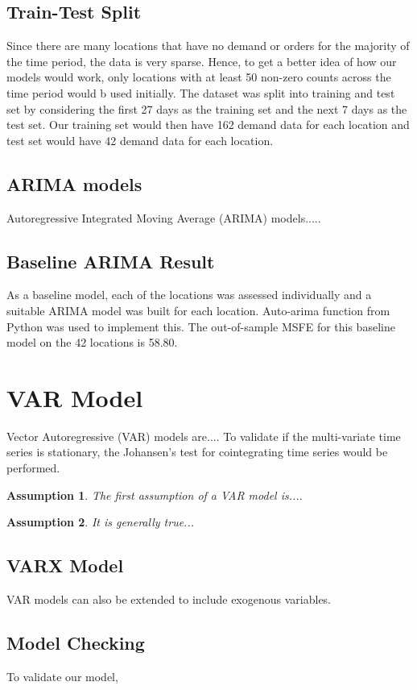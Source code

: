 \documentclass[10pt, letterpaper] {article}
\newtheorem{assumption}{Assumption}
\begin{document}
\subsection{Train-Test Split}
Since there are many locations that have no demand or orders for the majority of the time period, the data is very sparse. Hence, to get a better idea of how our models would work, only locations with at least 50 non-zero counts across the time period would b used initially. The dataset was split into training and test set by considering the first 27 days as the training set and the next 7 days as the test set. Our training set would then have 162 demand data for each location and test set would have 42 demand data for each location. 

\subsection{ARIMA models}
Autoregressive Integrated Moving Average (ARIMA) models.....

\subsection{Baseline ARIMA Result}
As a baseline model, each of the locations was assessed individually and a suitable ARIMA model was built for each location. Auto-arima function from Python was used to implement this. The out-of-sample MSFE for this baseline model on the 42 locations is 58.80. 

\section{VAR Model}
Vector Autoregressive (VAR) models are....
To validate if the multi-variate time series is stationary, the Johansen's test for cointegrating time series would be performed.
\begin{assumption}
The first assumption of a VAR model is....
\end{assumption}
\begin{assumption}
It is generally true...
\end{assumption}

\subsection{VARX Model}
VAR models can also be extended to include exogenous variables. 

\subsection{Model Checking}
To validate our model,
\end{document}
